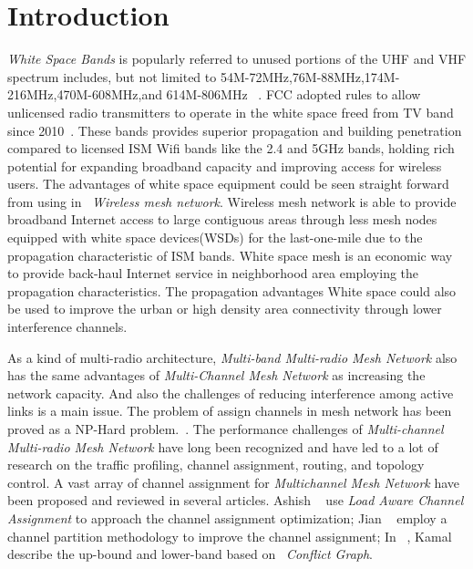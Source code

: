 \section{Introduction}
\label{sec:introduction}

\emph{White Space Bands} is popularly referred to unused portions of the UHF and VHF spectrum includes, but not limited to 54M-72MHz,76M-88MHz,174M-216MHz,470M-608MHz,and 614M-806MHz ~\cite{whitespacewiki}.
FCC adopted rules to allow unlicensed radio transmitters to operate in the white space freed from TV band since 2010~\cite{fccwhitespace}. 
 These bands provides superior propagation and building penetration compared to licensed ISM Wifi bands like the 2.4 and 5GHz bands, holding rich potential for expanding broadband capacity and improving access for wireless users.
The advantages of white space equipment could be seen straight forward from using in ~\emph{Wireless mesh network}.
Wireless mesh network is able to provide broadband Internet access to large contiguous areas through less mesh nodes equipped with white space devices(WSDs) for the last-one-mile due to the propagation characteristic of ISM bands. 
White space mesh is an economic way to provide back-haul Internet service in neighborhood area employing the propagation characteristics.
The propagation advantages White space could also be used to improve the urban or high density area connectivity through lower interference channels. 

As a kind of multi-radio architecture, \emph{Multi-band Multi-radio Mesh Network} also has the same advantages of \emph{Multi-Channel Mesh Network} as increasing the network capacity. And also the challenges of reducing interference among active links is a main issue. 
The problem of assign channels in mesh network has been proved as a NP-Hard problem.~\cite{jain2005impact}. 
The performance challenges of \emph{Multi-channel Multi-radio Mesh Network} have long been recognized and have led to a lot of research on the traffic profiling, channel assignment, routing, and topology control. A vast array of channel assignment for \emph{Multichannel Mesh Network} have been proposed and reviewed in several articles.
Ashish ~\cite{raniwala2004centralized} use \emph{Load Aware Channel Assignment} to approach the channel assignment optimization; Jian ~\cite{tang2005interference} employ a channel partition methodology to improve the channel assignment; In ~\cite{jain2005impact}, Kamal describe the up-bound and lower-band based on ~\emph{Conflict Graph}.

